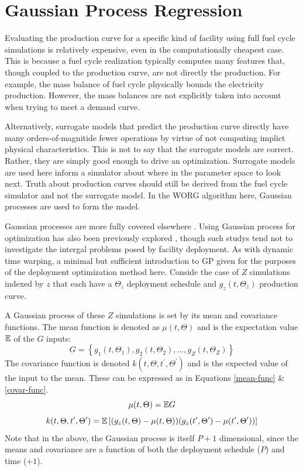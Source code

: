 \section{Gaussian Process Regression}
\label{gp}

Evaluating the production curve for a specific kind of facility using 
full fuel cycle simulations is relatively expensive, even in the 
computationally cheapest case. This is because a fuel cycle realization 
typically computes many features that, though coupled to the production 
curve, are not directly the production. For example, the mass balance of 
fuel cycle physically bounds the electricity production. However, the 
mass balances are not explicitly taken into account when trying to meet
a demand curve.

Alternatively, surrogate models that predict the production curve directly
have many orders-of-magnitide fewer operations by virtue of not computing
implict physical characteristics. This is not to say that the surrogate 
models are correct.  Rather, they are simply good enough to drive an 
optimization. Surrogate models are used here inform a simulator about where
in the parameter space to look next. Truth about production curves should
still be derived from the fuel cycle simulator and not the surrogate model.
In the WORG algorithm here, Gaussian processes are used to form the model. 

Gaussian processes are more fully covered elsewhere 
\cite{rasmussen2006gaussian}. Using Gaussian process for optimization has 
also been previously explored \citeme, though such studys tend not to 
investigate the intergal problems posed by facility deployment. As with 
dynamic time warping, a minimal but sufficient introduction to GP given for 
the purposes of the deployment optimization method here.
Conside the case of $Z$ simulations indexed by $z$ that each have a 
$\Theta_z$ deployment schedule and $g_z(t, \Theta_z)$ production curve.

A Gaussian process of these $Z$ simulations is set by its mean and 
covariance functions. The mean function is denoted as $\mu(t, \Theta)$ and 
is the expectation value $\mathbb{E}$ of 
the $G$ inputs:
\begin{equation}
\label{G}
G = \left\{g_1(t, \Theta_1), g_2(t, \Theta_2), \ldots, 
           g_Z(t, \Theta_Z)\right\}
\end{equation}
The covariance function is denoted $k(t, \Theta, t^\prime, \Theta^\prime)$ 
and is the expected value of the input to the mean. These can be expressed as
in Equations \ref{mean-func} \& \ref{covar-func}.
\begin{equation}
\label{mean-func}
\mu(t, \Theta) = \mathbb{E} G
\end{equation}
\begin{equation}
\label{covar-func}
k(t, \Theta, t^\prime, \Theta^\prime) = 
    \mathbb{E}\left[(g_z(t, \Theta) - \mu(t, \Theta))
            (g_z(t^\prime, \Theta^\prime) - \mu(t^\prime, \Theta^\prime))
      \right]
\end{equation}
Note that in the above, the Gaussian process is itself $P+1$ dimensional, 
since the means and covariance are a function of both the deployment 
schedule ($P$) and time ($+1$).

